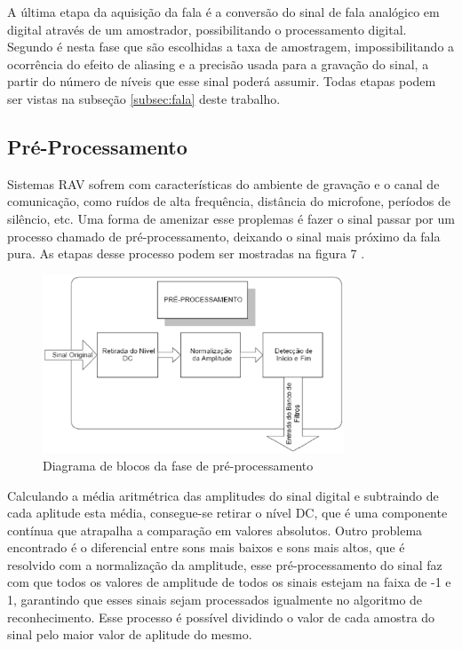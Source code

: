 A última etapa da aquisição da fala é a conversão do sinal de fala analógico em digital através de um
amostrador, possibilitando o processamento digital. Segundo  é nesta fase que são
escolhidas a taxa de amostragem, impossibilitando a ocorrência do efeito de aliasing e a precisão usada para a gravação do sinal, a partir do número de níveis que esse sinal poderá assumir. 
Todas etapas podem ser vistas na subseção \ref{subsec:fala} deste trabalho.


\subsection{Pré-Processamento}
Sistemas RAV sofrem com características do ambiente de gravação e o canal de comunicação, como ruídos de alta frequência, distância do microfone, períodos de silêncio, etc. Uma forma de amenizar esse proplemas é fazer o sinal passar por um processo chamado de pré-processamento, deixando o sinal mais próximo da fala pura. As etapas desse processo podem ser mostradas na figura 7 \cite{RavIsolAnderson}. 

\begin{figure}[H]
\includegraphics[width=0.8\textwidth]{graficos/pre_proc.eps}
\caption{Diagrama de blocos da fase de pré-processamento}
\end{figure}

Calculando a média aritmétrica das amplitudes do sinal digital e subtraindo de cada aplitude esta média, consegue-se retirar o nível DC, que é uma componente contínua que atrapalha a comparação em valores absolutos. Outro problema encontrado é o diferencial entre sons mais baixos e sons mais altos, que é resolvido com a normalização da amplitude, esse pré-processamento do sinal faz com que todos os valores de amplitude de todos os sinais estejam na faixa de -1 e 1, garantindo que esses sinais sejam processados igualmente no algoritmo de reconhecimento. Esse processo é possível dividindo o valor de cada amostra do sinal pelo maior valor de aplitude do mesmo. 

